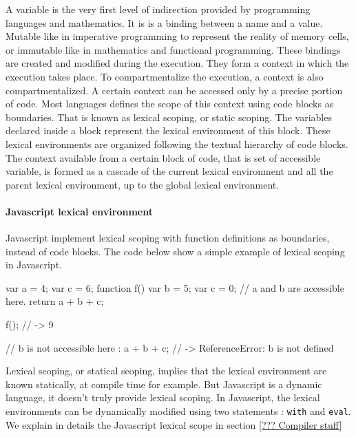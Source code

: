 A variable is the very first level of indirection provided by programming languages and mathematics.
It is is a binding between a name and a value.
Mutable like in imperative programming to represent the reality of memory cells, or immutable like in mathematics and functional programming.
These bindings are created and modified during the execution.
They form a context in which the execution takes place.
To compartmentalize the execution, a context is also compartmentalized.
A certain context can be accessed only by a precise portion of code.
Most languages defines the scope of this context using code blocks as boundaries.
That is known as lexical scoping, or static scoping.
The variables declared inside a block represent the lexical environment of this block.
These lexical environments are organized following the textual hierarchy of code blocks.
The context available from a certain block of code, that is set of accessible variable, is formed as a cascade of the current lexical environment and all the parent lexical environment, up to the global lexical environment.


\paragraph{Javascript lexical environment}

Javascript implement lexical scoping with function definitions as boundaries, instead of code blocks.
The code below show a simple example of lexical scoping in Javascript.

\begin{code}
  var a = 4;
  var c = 6;
  function f() {
    var b = 5;
    var c = 0;
    // a and b are accessible here.
    return a + b + c;
  }

  f(); // -> 9

  // b is not accessible here :
  a + b + c; // -> ReferenceError: b is not defined
\end{code}

Lexical scoping, or statical scoping, implies that the lexical environment are known statically, at compile time for example.
But Javascript is a dynamic language, it doesn't truly provide lexical scoping.
In Javascript, the lexical environments can be dynamically modified using two statements : \texttt{with} and \texttt{eval}.
We explain in details the Javascript lexical scope in section \ref{??? Compiler stuff}


